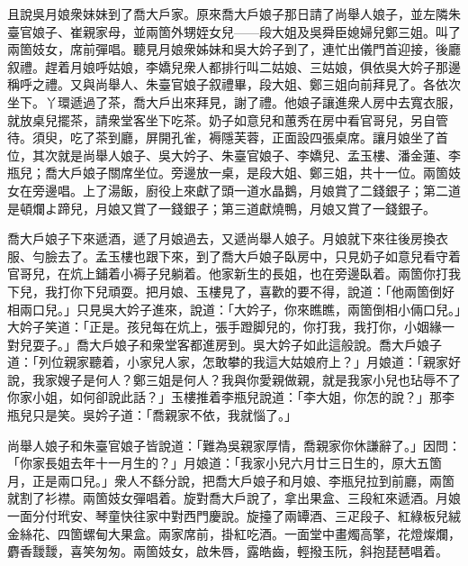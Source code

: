 且說吳月娘衆妹妹到了喬大戶家。原來喬大戶娘子那日請了尚舉人娘子，並左隣朱臺官娘子、崔親家母，並兩箇外甥姪女兒——段大姐及吳舜臣媳婦兒鄭三姐。叫了兩箇妓女，席前彈唱。聽見月娘衆姊妹和吳大妗子到了，連忙出儀門首迎接，後廳叙禮。趕着月娘呼姑娘，李嬌兒衆人都排行叫二姑娘、三姑娘，俱依吳大妗子那邊稱呼之禮。又與尚舉人、朱臺官娘子叙禮畢，段大姐、鄭三姐向前拜見了。各依次坐下。丫環遞過了茶，喬大戶出來拜見，謝了禮。他娘子讓進衆人房中去寬衣服，就放桌兒擺茶，請衆堂客坐下吃茶。奶子如意兒和蕙秀在房中看官哥兒，另自管待。須臾，吃了茶到廳，屏開孔雀，褥隱芙蓉，正面設四張桌席。讓月娘坐了首位，其次就是尚舉人娘子、吳大妗子、朱臺官娘子、李嬌兒、孟玉樓、潘金蓮、李瓶兒；喬大戶娘子關席坐位。旁邊放一桌，是段大姐、鄭三姐，共十一位。兩箇妓女在旁邊唱。上了湯飯，廚役上來獻了頭一道水晶鵝，月娘賞了二錢銀子；第二道是頓爛よ蹄兒，月娘又賞了一錢銀子；第三道獻燒鴨，月娘又賞了一錢銀子。

喬大戶娘子下來遞酒，遞了月娘過去，又遞尚舉人娘子。月娘就下來往後房換衣服、勻臉去了。孟玉樓也跟下來，到了喬大戶娘子臥房中，只見奶子如意兒看守着官哥兒，在炕上鋪着小褥子兒躺着。他家新生的長姐，也在旁邊臥着。兩箇你打我下兒，我打你下兒頑耍。{}把月娘、玉樓見了，喜歡的要不得，說道：「他兩箇倒好相兩口兒。」只見吳大妗子進來，說道：「大妗子，你來瞧瞧，兩箇倒相小倆口兒。」大妗子笑道：「正是。孩兒每在炕上，張手蹬脚兒的，你打我，我打你，小姻緣一對兒耍子。」喬大戶娘子和衆堂客都進房到。吳大妗子如此這般說。喬大戶娘子道：「列位親家聽着，小家兒人家，怎敢攀的我這大姑娘府上？」月娘道：「親家好說，我家嫂子是何人？鄭三姐是何人？我與你愛親做親，就是我家小兒也玷辱不了你家小姐，如何卻說此話？」玉樓推着李瓶兒說道：「李大姐，你怎的說？」那李瓶兒只是笑。{}吳妗子道：「喬親家不依，我就惱了。」

尚舉人娘子和朱臺官娘子皆說道：「難為吳親家厚情，喬親家你休謙辭了。」因問：「你家長姐去年十一月生的？」月娘道：「我家小兒六月廿三日生的，原大五箇月，正是兩口兒。」衆人不繇分說，把喬大戶娘子和月娘、李瓶兒拉到前廳，兩箇就割了衫襟。兩箇妓女彈唱着。旋對喬大戶說了，拿出果盒、三段紅來遞酒。月娘一面分付玳安、琴童快往家中對西門慶說。旋擡了兩罈酒、三疋段子、紅綠板兒絨金絲花、四箇螺甸大果盒。兩家席前，掛紅吃酒。一面堂中畫燭高擎，花燈燦爛，麝香靉靉，喜笑匆匆。兩箇妓女，啟朱唇，露皓齒，輕撥玉阮，斜抱琵琶唱着。

